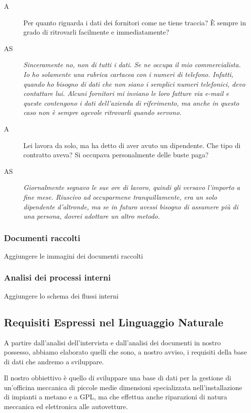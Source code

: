 \begin{description}
 			\item[A]
 				Per quanto riguarda i dati dei fornitori come ne tiene traccia? È sempre in grado di ritrovarli facilmente e immediatamente?
 			\item[AS]
 				\emph{Sinceramente no, non di tutti i dati. Se ne occupa il mio commercialista. Io ho solamente una rubrica cartacea con i numeri di telefono. Infatti, quando ho bisogno di dati che non siano i semplici numeri telefonici, devo contattare lui. Alcuni fornitori mi inviano le loro fatture via e-mail e queste contengono i dati dell'azienda di riferimento, ma anche in questo caso non è sempre agevole ritrovarli quando servono.}
 			\item[A]
 				Lei lavora da solo, ma ha detto di aver avuto un dipendente. Che tipo di contratto aveva? Si occupava personalmente delle buste paga?
 			\item[AS]
 				\emph{Giornalmente segnavo le sue ore di lavoro, quindi gli versavo l'importo a fine mese. Riuscivo ad occuparmene tranquillamente, era un solo dipendente d'altronde, ma se in futuro avessi bisogno di assumere più di una persona, dovrei adottare un altro metodo.}
		\end{description}
				
		\subsubsection{Documenti raccolti}
			Aggiungere le immagini dei documenti raccolti
		\subsubsection{Analisi dei processi interni}
			Aggiungere lo schema dei flussi interni
		
	\subsection{Requisiti Espressi nel Linguaggio Naturale}
	
		A partire dall’analisi dell’intervista e dall’analisi dei documenti in nostro possesso, abbiamo elaborato quelli che sono, a nostro avviso, i requisiti della base di dati che andremo a sviluppare.
		
		Il nostro obbiettivo è quello di sviluppare una base di dati per la gestione di un’officina meccanica di piccole medie dimensioni specializzata nell’installazione di impianti a metano e a GPL, ma che effettua anche riparazioni di natura meccanica ed elettronica alle autovetture.
		
